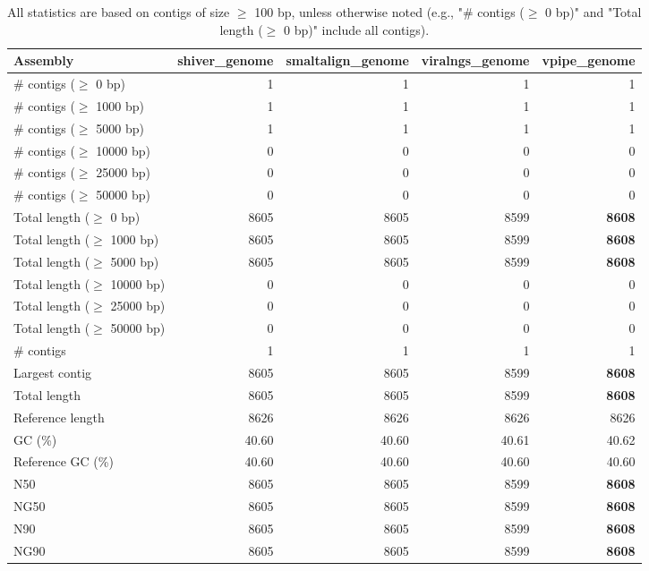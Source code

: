 \documentclass[12pt,a4paper]{article}
\begin{document}
\begin{table}[ht]
\begin{center}
\caption{All statistics are based on contigs of size $\geq$ 100 bp, unless otherwise noted (e.g., "\# contigs ($\geq$ 0 bp)" and "Total length ($\geq$ 0 bp)" include all contigs).}
\begin{tabular}{|l*{4}{|r}|}
\hline
Assembly & shiver\_genome & smaltalign\_genome & viralngs\_genome & vpipe\_genome \\ \hline
\# contigs ($\geq$ 0 bp) & 1 & 1 & 1 & 1 \\ \hline
\# contigs ($\geq$ 1000 bp) & 1 & 1 & 1 & 1 \\ \hline
\# contigs ($\geq$ 5000 bp) & 1 & 1 & 1 & 1 \\ \hline
\# contigs ($\geq$ 10000 bp) & 0 & 0 & 0 & 0 \\ \hline
\# contigs ($\geq$ 25000 bp) & 0 & 0 & 0 & 0 \\ \hline
\# contigs ($\geq$ 50000 bp) & 0 & 0 & 0 & 0 \\ \hline
Total length ($\geq$ 0 bp) & 8605 & 8605 & 8599 & {\bf 8608} \\ \hline
Total length ($\geq$ 1000 bp) & 8605 & 8605 & 8599 & {\bf 8608} \\ \hline
Total length ($\geq$ 5000 bp) & 8605 & 8605 & 8599 & {\bf 8608} \\ \hline
Total length ($\geq$ 10000 bp) & 0 & 0 & 0 & 0 \\ \hline
Total length ($\geq$ 25000 bp) & 0 & 0 & 0 & 0 \\ \hline
Total length ($\geq$ 50000 bp) & 0 & 0 & 0 & 0 \\ \hline
\# contigs & 1 & 1 & 1 & 1 \\ \hline
Largest contig & 8605 & 8605 & 8599 & {\bf 8608} \\ \hline
Total length & 8605 & 8605 & 8599 & {\bf 8608} \\ \hline
Reference length & 8626 & 8626 & 8626 & 8626 \\ \hline
GC (\%) & 40.60 & 40.60 & 40.61 & 40.62 \\ \hline
Reference GC (\%) & 40.60 & 40.60 & 40.60 & 40.60 \\ \hline
N50 & 8605 & 8605 & 8599 & {\bf 8608} \\ \hline
NG50 & 8605 & 8605 & 8599 & {\bf 8608} \\ \hline
N90 & 8605 & 8605 & 8599 & {\bf 8608} \\ \hline
NG90 & 8605 & 8605 & 8599 & {\bf 8608} \\ \hline

\end{tabular}
\end{center}
\end{table}
\end{document}
